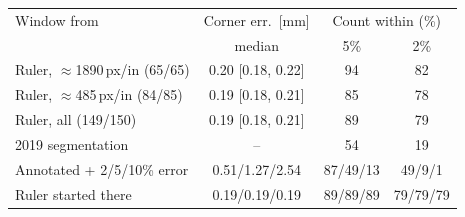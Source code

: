 \begin{tabular}{@{}lccc@{}}
\toprule
Window from & Corner err.\ [mm] & \multicolumn{2}{c}{Count within (\%)} \\
 & median & 5\% & 2\% \\
\midrule
Ruler, $\approx$1890\,px/in (65/65) & 0.20 [0.18, 0.22] & 94 & 82 \\
Ruler, $\approx$485\,px/in (84/85) & 0.19 [0.18, 0.21] & 85 & 78 \\
Ruler, all (149/150) & 0.19 [0.18, 0.21] & 89 & 79 \\
\midrule
2019 segmentation & -- & 54 & 19 \\
Annotated + 2/5/10\% error & 0.51/1.27/2.54 & 87/49/13 & 49/9/1 \\
Ruler started there & 0.19/0.19/0.19 & 89/89/89 & 79/79/79 \\
\bottomrule
\end{tabular}
